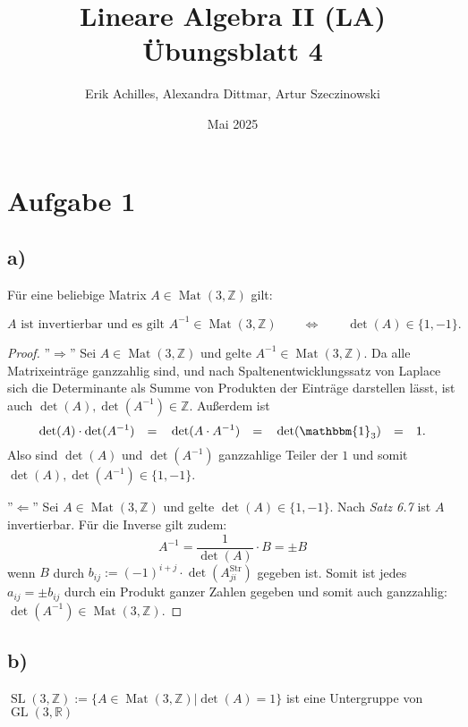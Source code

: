 \documentclass{article}
\title{Lineare Algebra II (LA) Übungsblatt 4}
\author{Erik Achilles, Alexandra Dittmar, Artur Szeczinowski}
\date{Mai 2025}
\newcommand{\ZZ}{\mathbb{Z}}
\newcommand{\RR}{\mathbb{R}}
\newcommand{\equ}{\mathbb{\Leftrightarrow}}
\newcommand{\eq}{\mathbb{\quad = \quad}}
\DeclareMathOperator{\Mat}{Mat}
\DeclareMathOperator{\GL}{GL}
\DeclareMathOperator{\SL}{SL}
\begin{document}
\section*{Aufgabe 1}

\subsection*{a)}
Für eine beliebige Matrix
$A \in \Mat(3,\ZZ)$
gilt:

\[
\text{$A$ ist invertierbar und es gilt $A^{-1} \in \Mat(3,\ZZ)$}
\qquad\equ\qquad
\det(A) \in \{1,-1\}.
\]
\begin{proof}
  ''$\Rightarrow$''  
  Sei $A \in \Mat(3,\ZZ)$
  und gelte
  $A^{-1} \in \Mat(3,\ZZ)$.
  Da alle Matrixeinträge
  ganzzahlig sind, und
  nach Spaltenentwicklungssatz von Laplace
  sich die Determinante als Summe von
  Produkten der Einträge darstellen lässt, ist auch
  $\det(A), \det(A^{-1}) \in \ZZ$.
  Außerdem ist
  \[
  \det(A) \cdot \det(A^{-1})
  \eq
  \det(A \cdot A^{-1})
  \eq
  \det(\mathbbm{1}_3)
  \eq
  1.
  \]
  Also sind
  $\det(A)$ und $\det(A^{-1})$
  ganzzahlige Teiler der $1$ und somit
  $\det(A), \det(A^{-1}) \in \{1,-1\}$.

  \bigbreak

  ''$\Leftarrow$''
  Sei $A \in \Mat(3,\ZZ)$
  und gelte
  $\det(A) \in \{1,-1\}$.
  Nach \textit{Satz 6.7}
  ist $A$ invertierbar.
  Für die Inverse gilt zudem:
  \[
  A^{-1} = \frac{1}{\det(A)} \cdot B = \pm B
  \]
  wenn $B$ durch
  $b_{ij} := (-1)^{i+j} \cdot \det(A_{ji}^{\text{Str}})$
  gegeben ist. Somit ist jedes $a_{ij} = \pm b_{ij}$ durch ein Produkt
  ganzer Zahlen gegeben und somit auch ganzzahlig:
  $\det(A^{-1}) \in \Mat(3,\ZZ)$.
\end{proof}

\subsection*{b)}

$\SL(3,\ZZ) := \{A \in \Mat(3,\ZZ) | \det(A) = 1\}$
ist eine Untergruppe von
$\GL(3,\RR)$
\end{document}
